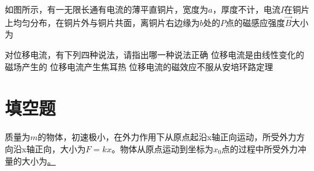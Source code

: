 如图所示，有一无限长通有电流的薄平直铜片，宽度为$a$，厚度不计，电流$I$在铜片上均匀分布，在铜片外与铜片共面，离铜片右边缘为$b$处的$P$点的磁感应强度$\vec{B}$大小为
{\ln{}}
{\ln{}}
{}%

对位移电流，有下列四种说法，请指出哪一种说法正确
{位移电流是由线性变化的磁场产生的}
{位移电流产生焦耳热}
{位移电流的磁效应不服从安培环路定理}

\section{填空题}

质量为$m$的物体，初速极小，在外力作用下从原点起沿x轴正向运动，所受外力方向沿x轴正向，大小为$F=kx$。物体从原点运动到坐标为$x_0$点的过程中所受外力冲量的大小为\ul。

